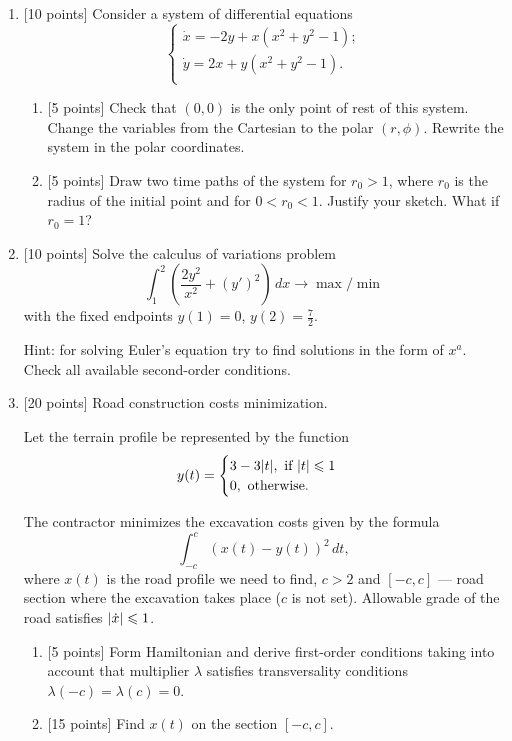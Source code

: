 \documentclass[12pt, a4paper]{article}
\DeclarePairedDelimiter{\abs}{\lvert}{\rvert}
\begin{document}
\begin{enumerate}


\item {[10 points]} Consider a system of differential equations
\[
\begin{cases}
  \dot x = - 2y + x({x^2} + {y^2} - 1);\\
  \dot y =  2x + y({x^2} + {y^2} - 1).\\
\end{cases}
\]
\begin{enumerate}
  \item {[5 points]} Check that $(0,0)$ is the only point of rest of this system. Change the variables from the Cartesian to the polar $(r, \phi )$. Rewrite the system in the polar coordinates.
  \item {[5 points]} Draw two time paths of the system for $r_0 > 1$, where $r_0$ is the radius of the initial point and for $0 < r_0 < 1$. Justify your sketch. What if $r_0 = 1$?
\end{enumerate}

\item {[10 points]} Solve the calculus of variations problem \[
\int_1^2 \left( \frac{2y^2}{x^2} + (y')^2 \right) \, dx \to \max /\min
\]
with the fixed endpoints $y(1) = 0$, $y(2) = \frac{7}{2}$.

Hint: for solving Euler’s equation try to find solutions in the form of $x^a$. Check all available second-order conditions.

\item {[20 points]} Road construction costs minimization.

Let the terrain profile be represented by the function
\[
y(t) =
\begin{cases}
3 - 3\abs{t}, \text{ if } \abs{t}\leq 1 \\
0, \text{ otherwise.} \\
\end{cases}
\]

The contractor minimizes the excavation costs given by the formula
\[
\int_{-c}^c (x(t) - y(t))^2 \, dt,
\]
where $x(t)$ is the road profile we need to find, $c > 2$ and $[ - c,c]$ — road section where the excavation takes place ($c$ is not set). Allowable grade of the road satisfies  $\abs{\dot x }\leq 1$.

\begin{enumerate}
\item {[5 points]} Form Hamiltonian and derive first-order conditions taking into account that multiplier $\lambda$ satisfies transversality conditions $\lambda(-c) = \lambda(c) = 0$.
\item {[15 points]} Find $x(t)$ on the section $[ - c,c]$.
\end{enumerate}

\end{enumerate}
\end{document}
